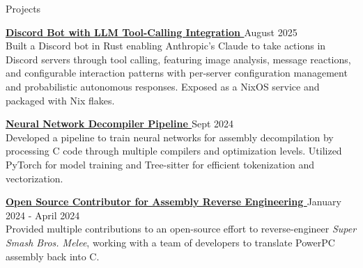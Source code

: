\documentclass{resume}
\newcommand{\scaledfaExternalLink}{\raisebox{0.1\height}{\scalebox{0.7}{\faExternalLink*}}}
\begin{document}
\begin{rSection}{Projects}

\item{} {\bf{}
    \href{https://github.com/wyatt-avilla/claude-discord-bot}{Discord
  Bot with LLM Tool-Calling Integration \scaledfaExternalLink}}
  {\hfill{} August 2025} \\
  Built a Discord bot in Rust enabling Anthropic's Claude to take
  actions in Discord servers through tool calling, featuring image
  analysis, message reactions, and configurable interaction patterns
  with per-server configuration management and probabilistic
  autonomous responses. Exposed as a NixOS service and packaged with Nix flakes.

\item{} {\bf{} \href{https://github.com/wyatt-avilla/sunbird}{Neural
  Network Decompiler Pipeline \scaledfaExternalLink}} {\hfill{} Sept 2024} \\
  Developed a pipeline to train neural networks for assembly
  decompilation by processing C code through multiple compilers and
  optimization levels. Utilized PyTorch for model training and
  Tree-sitter for efficient tokenization and vectorization.

\item{} {\bf{}
    \href{https://github.com/search?q=repo\%3Adoldecomp\%2Fmelee++author\%3Awyatt-avilla&type=pullrequests&ref=advsearch}{Open
      Source Contributor for
  Assembly Reverse Engineering \scaledfaExternalLink}} {\hfill{}
  January 2024 - April 2024} \\
  Provided multiple contributions to an open-source effort to reverse-engineer
  \textit{Super Smash Bros. Melee}, working with a team of developers
  to translate PowerPC
  assembly back into C.

\end{rSection}
\end{document}
